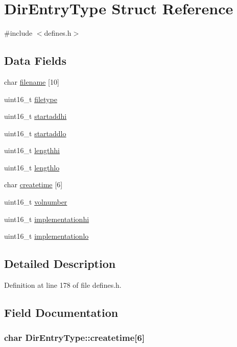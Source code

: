 \hypertarget{structDirEntryType}{\section{Dir\-Entry\-Type Struct Reference}
\label{structDirEntryType}
}


{\ttfamily \#include $<$defines.\-h$>$}

\subsection*{Data Fields}
\begin{DoxyCompactItemize}
\item 
char \hyperlink{structDirEntryType_aa60fae0a6b7ba9c966cbcf46e555f396}{filename} \mbox{[}10\mbox{]}
\item 
uint16\-\_\-t \hyperlink{structDirEntryType_ada14562440087858ebf04bc4c81eedd2}{filetype}
\item 
uint16\-\_\-t \hyperlink{structDirEntryType_a0cab2915e9f864e25b24d298c36c11db}{startaddhi}
\item 
uint16\-\_\-t \hyperlink{structDirEntryType_aea0e798bb172b4bddf174ce339a4a54a}{startaddlo}
\item 
uint16\-\_\-t \hyperlink{structDirEntryType_ad7aaba7b01038bc8bacb096bd66fff08}{lengthhi}
\item 
uint16\-\_\-t \hyperlink{structDirEntryType_ad1cde25a0229866557cd5983c27fbd31}{lengthlo}
\item 
char \hyperlink{structDirEntryType_a627fd55537c73d4fee596b140e106c01}{createtime} \mbox{[}6\mbox{]}
\item 
uint16\-\_\-t \hyperlink{structDirEntryType_add9ab11f89586efb100471f6580e75c5}{volnumber}
\item 
uint16\-\_\-t \hyperlink{structDirEntryType_a27a15eea3264d44c9e93e3be77093151}{implementationhi}
\item 
uint16\-\_\-t \hyperlink{structDirEntryType_a8164d577c06fb7c312aaa4955d491449}{implementationlo}
\end{DoxyCompactItemize}


\subsection{Detailed Description}


Definition at line 178 of file defines.\-h.



\subsection{Field Documentation}
\hypertarget{structDirEntryType_a627fd55537c73d4fee596b140e106c01}{
\subsubsection[{createtime}]{\setlength{\rightskip}{0pt plus 5cm}char Dir\-Entry\-Type\-::createtime\mbox{[}6\mbox{]}}}\label{structDirEntryType_a627fd55537c73d4fee596b140e106c01}


